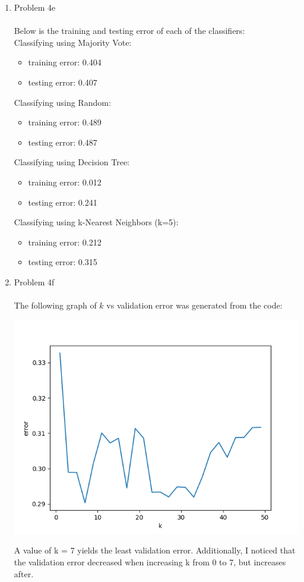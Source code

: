 \documentclass[11pt]{article}
\newcommand{\solution}[1]{{{\color{blue}{\bf Solution:} {#1}}}}
\begin{document}
\begin{enumerate}
\item Problem 4e \\
\solution{} \\
Below is the training and testing error of each of the classifiers: \\
Classifying using Majority Vote: 
\begin{itemize}
	\item training error: 0.404
	\item testing error: 0.407
\end{itemize}
Classifying using Random: 
\begin{itemize}
	\item training error: 0.489
	\item testing error: 0.487
\end{itemize}
Classifying using Decision Tree: 
\begin{itemize}
	\item training error: 0.012
	\item testing error: 0.241
\end{itemize}
Classifying using k-Nearest Neighbors (k=5): 
\begin{itemize}
	\item training error: 0.212
	\item testing error: 0.315
\end{itemize}

\item Problem 4f \\
\solution{} \\
The following graph of $k$ vs validation error was generated from the code: \\
\centerline{\includegraphics[scale=0.5]{Figure_1}}
A value of k = 7 yields the least validation error. Additionally, I noticed that the validation error decreased when increasing k from 0 to 7, but increases after.


\end{enumerate}
\end{document}
